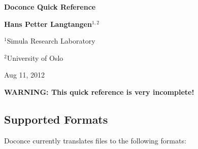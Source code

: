 \documentclass[twoside]{article}
\begin{document}

\begin{center}
{\LARGE\bf Doconce Quick Reference}
\end{center}





\begin{center}
{\bf Hans Petter Langtangen${}^{1, 2}$} \\ [0mm]
\end{center}

\begin{center}
\centerline{{\small ${}^1$Simula Research Laboratory}}
\centerline{{\small ${}^2$University of Oslo}}
\end{center}





\begin{center}
Aug 11, 2012
\end{center}



\tableofcontents




\textbf{WARNING: This quick reference is very incomplete!}

\subsection{Supported Formats}

Doconce currently translates files to the following formats:
\end{document}
